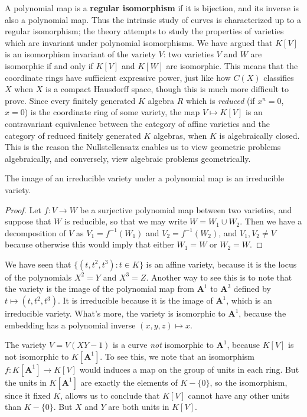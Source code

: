 A polynomial map is a {\bf regular isomorphism} if it is bijection, and its inverse is also a polynomial map. Thus the intrinsic study of curves is characterized up to a regular isomorphism; the theory attempts to study the properties of varieties which are invariant under polynomial isomorphisms. We have argued that $K[V]$ is an isomorphism invariant of the variety $V$: two varieties $V$ and $W$ are isomorphic if and only if $K[V]$ and $K[W]$ are isomorphic. This means that the coordinate rings have sufficient expressive power, just like how $C(X)$ classifies $X$ when $X$ is a compact Hausdorff space, though this is much more difficult to prove. Since every finitely generated $K$ algebra $R$ which is {\it reduced} (if $x^n = 0$, $x = 0$) is the coordinate ring of some variety, the map $V \mapsto K[V]$ is an contravariant equivalence between the category of affine varieties and the category of reduced finitely generated $K$ algebras, when $K$ is algebraically closed. This is the reason the Nullstellensatz enables us to view geometric problems algebraically, and conversely, view algebraic problems geometrically.

\begin{prop}
    The image of an irreducible variety under a polynomial map is an irreducible variety.
\end{prop}
\begin{proof}
    Let $f: V \to W$ be a surjective polynomial map between two varieties, and suppose that $W$ is reducible, so that we may write $W = W_1 \cup W_2$. Then we have a decomposition of $V$ as $V_1 = f^{-1}(W_1)$ and $V_2 = f^{-1}(W_2)$, and $V_1, V_2 \neq V$ because otherwise this would imply that either $W_1 = W$ or $W_2 = W$.
\end{proof}

\begin{example}
    We have seen that $\{ (t,t^2,t^3): t \in K \}$ is an affine variety, because it is the locus of the polynomials $X^2 = Y$ and $X^3 = Z$. Another way to see this is to note that the variety is the image of the polynomial map from $\mathbf{A}^1$ to $\mathbf{A}^3$ defined by $t \mapsto (t,t^2,t^3)$. It is irreducible because it is the image of $\mathbf{A}^1$, which is an irreducible variety. What's more, the variety is isomorphic to $\mathbf{A}^1$, because the embedding has a polynomial inverse $(x,y,z) \mapsto x$.
\end{example}

\begin{example}
    The variety $V = V(XY - 1)$ is a curve {\it not} isomorphic to $\mathbf{A}^1$, because $K[V]$ is not isomorphic to $K[\mathbf{A}^1]$. To see this, we note that an isomorphism $f: K[\mathbf{A}^1] \to K[V]$ would induces a map on the group of units in each ring. But the units in $K[\mathbf{A}^1]$ are exactly the elements of $K - \{ 0 \}$, so the isomorphism, since it fixed $K$, allows us to conclude that $K[V]$ cannot have any other units than $K - \{ 0 \}$. But $X$ and $Y$ are both units in $K[V]$.
\end{example}

